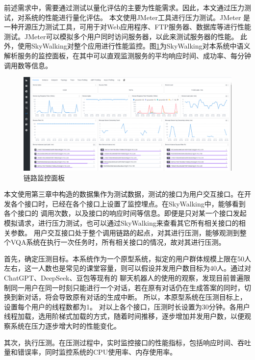 前述需求中，需要通过测试以量化评估的主要为性能需求。因此，本文通过压力测试，对系统的性能进行量化评估。
本文使用JMeter工具进行压力测试。JMeter 是一种开源压力测试工具，可用于对Web应用程序、FTP服务器、数据库等进行性能测试。JMeter可以模拟多个用户同时访问服务器，以此来测试服务器的性能。
此外，使用SkyWalking对整个应用进行性能监控。图\ref{fig:SkyWalking}为SkyWalking对本系统中语义解析服务的监控面板，在其中可以直观监测服务的平均响应时间、成功率、每分钟调用数等信息。
\begin{figure}[h]
    \centering
    \includegraphics[width=\textwidth]{figures/SkyWalking.png}
    \caption{链路监控面板}
    \label{fig:SkyWalking}
\end{figure}

本文使用第三章中构造的数据集作为测试数据，测试的接口为用户交互接口。在开发各个接口时，已经在各个接口上设置了监控埋点。在SkyWalking中，能够看到各个接口的
调用次数，以及接口的响应时间等信息。即便是只对某一个接口发起模拟请求，进行压力测试，也可以通过SkyWalking来查看其它所有相关接口的相关参数。
用户交互接口处于整个调用链路的起点，对其进行压测，能够观测到整个VQA系统在执行一次任务时，所有相关接口的情况，故对其进行压测。

首先，确定压测目标。本系统作为一个原型系统，拟定的用户群体规模上限在50人左右，这一人数也是常见的课堂容量，则可以假设并发用户数目标为40人。通过对ChatGPT、DeepSeek、豆包等现有的
聊天机器人的使用的观察，发现目前普遍限制同一用户在同一时刻只能进行一个对话，若在原有对话仍在生成答案的同时，切换到新对话，将会导致原有对话的生成中断。
所以，本原型系统在压测目标上，设置每个用户的线程数都为1。
对以上各个接口，压测时长设置为30分钟。各用户线程加载，选用阶梯式加载的方式，随着时间推移，逐步增加并发用户数，以便观察系统在压力逐步增大时的性能变化。

其次，执行压测。在压测过程中，实时监控接口的性能指标，包括响应时间、吞吐量和错误率，同时监控系统的CPU使用率、内存使用率。

